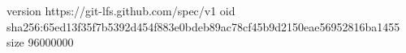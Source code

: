 version https://git-lfs.github.com/spec/v1
oid sha256:65ed13f35f7b5392d454f883e0bdeb89ac78cf45b9d2150eae56952816ba1455
size 96000000
